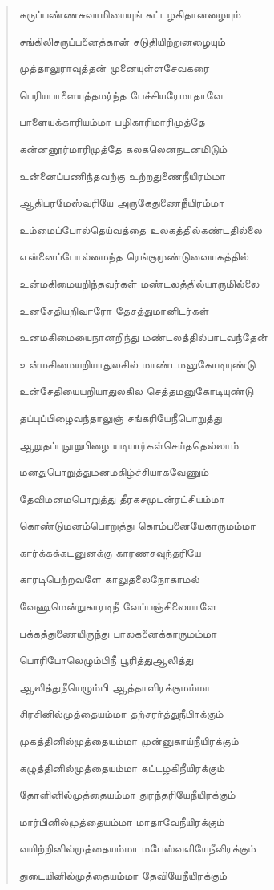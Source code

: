 \documentclass{article}
\begin{document}
\begin{quotation}
{கருப்பண்ணசுவாமியையுங் கட்டழகிதானழையும்

சங்‌கிலிசருப்பனைத்தான்‌ சடுதியிற்றுனழையும்‌

முத்தாலுராவுத்தன் முனையுள்ளசேவகரை

பெரியபாளையத்தமர்ந்த பேச்சியரேமாதாவே

பாளையக்காரியம்மா பழிகாரிமாரிமுத்தே

கன்னனூர்மாரிமுத்தே கலகலெனநடனமிடும்

உன்னைப்பணிந்தவற்கு உற்றதுணைநீயிரம்மா

ஆதிபரமேஸ்வரியே அருகேதுணைநீயிரம்மா

உம்மைப்போல்தெய்வத்தை உலகத்தில்கண்டதில்லை

என்னைப்போல்மைந்த ரெங்குமுண்டுவையகத்தில்

உன்மகிமையறிந்தவர்கள் மண்டலத்தில்யாருமில்லை

உனசேதியறிவாரோ தேசத்துமானிடர்கள்

உனமகிமையைநானறிந்து மண்டலத்தில்பாடவந்தேன்

உன்மகிமையறியாதுலகில் மாண்டமனுகோடியுண்டு

உன்சேதியையறியாதுலகில செத்தமனுகோடியுண்டு

தப்புப்பிழைவந்தாலுஞ் சங்கரியேநீபொறுத்து

ஆறுதப்புநூறுபிழை யடியார்கள்செய்ததெல்லாம்

மனதுபொறுத்துமனமகிழ்ச்சியாகவேணும்

தேவிமனமபொறுத்து தீரகசமுடன்ரட்சியம்மா

கொண்டுமனம்பொறுத்து கொம்பனையேகாருமம்மா

கார்க்கக்கடனுனக்கு காரணசவுந்தரியே

காரடிபெற்றவளே காலுதலைநோகாமல்

வேணுமென்றுகாரடிநீ வேப்பஞ்சிலையாளே

பக்கத்துணையிருந்து பாலகனைக்காருமம்மா

பொரிபோலெழும்பிநீ பூரித்துஆலித்து

ஆலித்துநீயெழும்பி ஆத்தாளிரக்குமம்மா

சிரசினில்முத்தையம்மா தற்சரா்த்துநீபிாக்கும்

முகத்‌தினில்முத்தையம்மா முன்னுகாய்நீயிரக்கும்‌

கழுத்தினில்முத்தையம்மா கட்டழகிநீயிரக்கும்

தோளினில்முத்தையம்மா துரந்தரியேநீயிரக்கும்

மார்பினில்முத்தையம்மா மாதாவேநீயிரக்கும்

வயிற்றினில்முத்தையம்மா மபேஸ்வஎியேநீவிரக்கும்

துடையினில்முத்தையம்மா தேவியேநீயிரக்கும்

}
\end{quotation}
\end{document}
